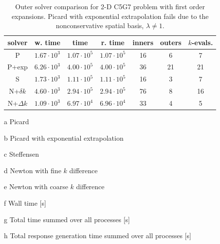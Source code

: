 \begin{table}[ht] 
 \begin{center} 
 \caption{Outer solver comparison for 2-D C5G7 problem with first order expansions.
          Picard with exponential extrapolation fails due to the nonconservative spatial 
          basis, \ie $\lambda \ne 1$.} 
 \label{tbl:c5g7_outer_study} 
  \begin{threeparttable}
 \begin{tabular}{ccccccc} 
 \toprule 
  solver & w. time\tnote{f} & time\tnote{g} & r. time\tnote{h} & inners & outers & $k$-evals. \\
  \midrule
    P\tnote{a}            &  $1.67\cdot 10^3$ &  $1.07\cdot 10^5$ &  $1.07\cdot 10^5$ &           16 &            6 &            7 \\ 
    P+exp\tnote{b}        &  $6.26\cdot 10^3$ &  $4.00\cdot 10^5$ &  $4.00\cdot 10^5$ &           36 &           21 &           21 \\ 
    S\tnote{c}            &  $1.73\cdot 10^3$ &  $1.11\cdot 10^5$ &  $1.11\cdot 10^5$ &           16 &            3 &            7 \\ 
    N+$\delta k$\tnote{d}            &  $4.60\cdot 10^3$ &  $2.94\cdot 10^5$ &  $2.94\cdot 10^5$ &           76 &            8 &           16 \\ 
    N+$\Delta k$\tnote{e} &  $1.09\cdot 10^3$ &  $6.97\cdot 10^4$ &  $6.96\cdot 10^4$ &           33 &            4 &            5 \\ 
 \bottomrule 
 \end{tabular} 
 
 {\footnotesize
 \begin{tablenotes}
   \item[a] Picard 
   \item[b] Picard with exponential extrapolation
   \item[c] Steffensen
   \item[d] Newton with fine $k$ difference
   \item[e] Newton with coarse $k$ difference
   \item[f] Wall time [s]
   \item[g] Total time summed over all processes [s]
   \item[h] Total response generation time summed over all processes [s]
 \end{tablenotes}
 }
 
 \end{threeparttable}
 
 \end{center} 

\end{table} 


